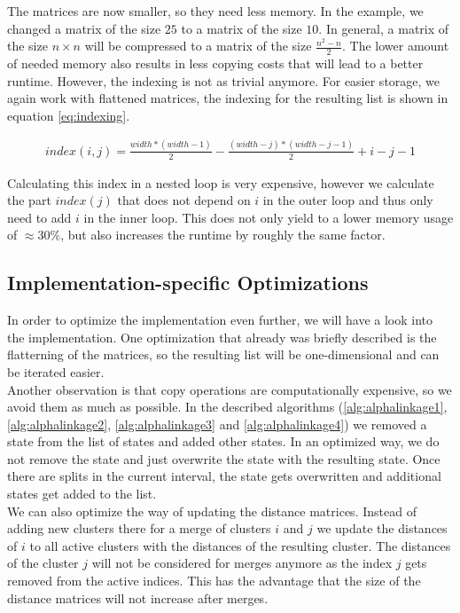 The matrices are now smaller, so they need less memory. In the example, we changed a matrix of the size $25$ to a matrix of the size $10$. In general, a matrix of the size $n \times n$ will be compressed to a matrix of the size $\frac{n^2-n}{2}$. The lower amount of needed memory also results in less copying costs that will lead to a better runtime. However, the indexing is not as trivial anymore. For easier storage, we again work with flattened matrices, the indexing for the resulting list is shown in equation \ref{eq:indexing}.

\begin{equation}
    \begin{aligned}
        index(i,j) = \frac{width * (width - 1)}{2} - \frac{(width - j) * (width - j - 1)}{2} + i - j - 1
    \end{aligned}
    \label{eq:indexing}
\end{equation}

Calculating this index in a nested loop is very expensive, however we calculate the part $index(j)$ that does not depend on $i$ in the outer loop and thus only need to add $i$ in the inner loop. This does not only yield to a lower memory usage of $\approx 30\%$, but also increases the runtime by roughly the same factor.

\subsection{Implementation-specific Optimizations}

In order to optimize the implementation even further, we will have a look into the implementation. One optimization that already was briefly described is the flatterning of the matrices, so the resulting list will be one-dimensional and can be iterated easier.\\

Another observation is that copy operations are computationally expensive, so we avoid them as much as possible. In the described algorithms (\ref{alg:alphalinkage1}, \ref{alg:alphalinkage2}, \ref{alg:alphalinkage3} and \ref{alg:alphalinkage4}) we removed a state from the list of states and added other states. In an optimized way, we do not remove the state and just overwrite the state with the resulting state. Once there are splits in the current interval, the state gets overwritten and additional states get added to the list.\\

We can also optimize the way of updating the distance matrices. Instead of adding new clusters there for a merge of clusters $i$ and $j$ we update the distances of $i$ to all active clusters with the distances of the resulting cluster. The distances of the cluster $j$ will not be considered for merges anymore as the index $j$ gets removed from the active indices. This has the advantage that the size of the distance matrices will not increase after merges.\\

